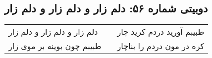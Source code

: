\begin{center}
\section*{دوبیتی شماره ۵۶: دلم زار و دلم زار و دلم زار}
\label{sec:056}
\begin{longtable}{l p{0.5cm} r}
دلم زار و دلم زار و دلم زار
&&
طبیبم آورید دردم کرید چار
\\
طبیبم چون بوینه بر موی زار
&&
کره در مون دردم را بناچار
\\
\end{longtable}
\end{center}
